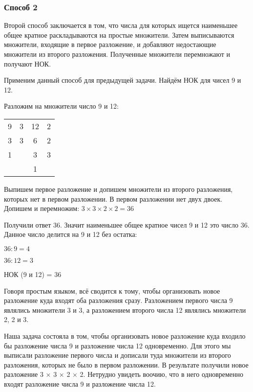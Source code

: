 \documentclass[12pt]{article}
\begin{document}
    \subsubsection{Способ 2}
    Второй способ заключается в том, что числа для которых ищется наименьшее общее кратное раскладываются на простые множители. Затем выписываются множители, входящие в первое разложение, и добавляют недостающие множители из второго разложения. Полученные множители перемножают и получают НОК.\par
    Применим данный способ для предыдущей задачи. Найдём НОК для чисел 9 и 12.\par
    Разложим на множители число 9 и 12:\par
    \begin{tabular}{c|cc|c}
         9 & 3 & 12 & 2 \\
         3 & 3 & 6 & 2\\
         1 & & 3 & 3\\
         & & 1 
    \end{tabular}\par
    Выпишем первое  разложение и допишем множители из второго разложения, которых нет в первом разложении. В первом разложении нет двух двоек. Допишем и перемножим: $3 \times 3 \times 2 \times 2 = 36$\par
    Получили ответ 36. Значит наименьшее общее кратное чисел 9 и 12 это число 36. Данное число делится на 9 и 12 без остатка:\par
    $36 : 9 = 4$\par
    $36 : 12 = 3$\par
    НОК (9 и 12) = 36\par
    Говоря простым языком, всё сводится к тому, чтобы организовать новое разложение куда входят оба разложения сразу. Разложением первого числа 9 являлись множители 3 и 3, а разложением второго числа 12 являлись множители 2, 2 и 3.\par
    Наша задача состояла в том, чтобы организовать новое разложение куда входило бы разложение числа 9 и разложение числа 12 одновременно. Для этого мы выписали разложение первого числа и дописали туда множители из второго разложения, которых не было в первом разложении. В результате получили новое разложение 3 × 3 × 2 × 2. Нетрудно увидеть воочию, что в него одновременно входят разложение числа 9 и разложение числа 12.\par
\end{document}
